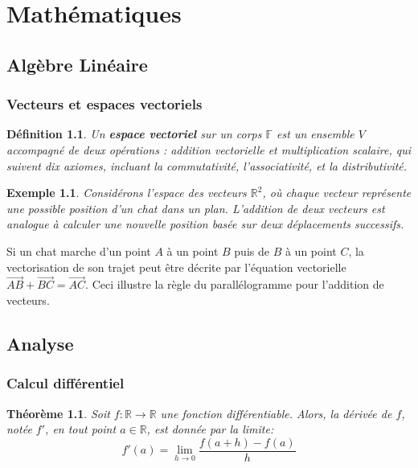 \documentclass{report}
\newtheorem{theorem}{Théorème}
\newtheorem{definition}{Définition}
\newtheorem{example}{Exemple}
\begin{document}
\chapter{Mathématiques}

\section{Algèbre Linéaire}
\subsection{Vecteurs et espaces vectoriels}
\begin{definition}
Un \textbf{espace vectoriel} sur un corps \(\mathbb{F}\) est un ensemble \(V\) accompagné de deux opérations : addition vectorielle et multiplication scalaire, qui suivent dix axiomes, incluant la commutativité, l'associativité, et la distributivité.
\end{definition}

\begin{example}
Considérons l'espace des vecteurs \(\mathbb{R}^2\), où chaque vecteur représente une possible position d'un chat dans un plan. L'addition de deux vecteurs est analogue à calculer une nouvelle position basée sur deux déplacements successifs.
\end{example}

\begin{boxedproperty}
Si un chat marche d'un point \( A \) à un point \( B \) puis de \( B \) à un point \( C \), la vectorisation de son trajet peut être décrite par l'équation vectorielle \(\vec{AB} + \vec{BC} = \vec{AC}\). Ceci illustre la règle du parallélogramme pour l'addition de vecteurs.
\end{boxedproperty}

\section{Analyse}
\subsection{Calcul différentiel}
\begin{theorem}
Soit \(f : \mathbb{R} \to \mathbb{R}\) une fonction différentiable. Alors, la dérivée de \(f\), notée \(f'\), en tout point \(a \in \mathbb{R}\), est donnée par la limite:
\[
f'(a) = \lim_{h \to 0} \frac{f(a+h) - f(a)}{h}
\]
\end{theorem}
\end{document}
